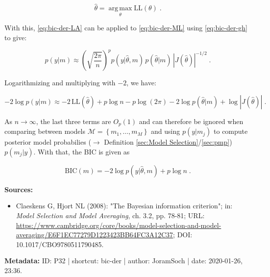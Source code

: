\documentclass[a4paper,12pt,twoside]{book}
\begin{document}
\begin{equation} \label{eq:bic-der-MLE}
\hat{\theta} = \operatorname*{arg\,max}_\theta \mathrm{LL}(\theta) \; .
\end{equation}

With this, \eqref{eq:bic-der-LA} can be applied to \eqref{eq:bic-der-ML} using \eqref{eq:bic-der-gh} to give:

\begin{equation} \label{eq:bic-der-ML-approx}
p(y|m) \approx \left( \sqrt{\frac{2 \pi}{n}} \right)^p p(y|\hat{\theta},m) \, p(\hat{\theta}|m) \, \left| J(\hat{\theta}) \right|^{-1/2} \; .
\end{equation}

Logarithmizing and multiplying with $-2$, we have:

\begin{equation} \label{eq:bic-der-LME-approx}
-2 \log p(y|m) \approx -2 \, \mathrm{LL}(\hat{\theta}) + p \log n - p \log(2 \pi) - 2 \log p(\hat{\theta}|m) + \log \left| J(\hat{\theta}) \right| \; .
\end{equation}

As $n \to \infty$, the last three terms are $O_p(1)$ and can therefore be ignored when comparing between models $\mathcal{M} = \left\lbrace m_1, \ldots, m_M \right\rbrace$ and using $p(y \vert m_j)$ to compute posterior model probabilies ($\rightarrow$ Definition \ref{sec:Model Selection}/\ref{sec:pmp}) $p(m_j \vert y)$. With that, the BIC is given as

\begin{equation} \label{eq:bic-der-BIC-qed}
\mathrm{BIC}(m) = -2 \log p(y|\hat{\theta}, m) + p \log n \; .
\end{equation}


\vspace{1em}
\textbf{Sources:}
\begin{itemize}
\item Claeskens G, Hjort NL (2008): "The Bayesian information criterion"; in: \textit{Model Selection and Model Averaging}, ch. 3.2, pp. 78-81; URL: \url{https://www.cambridge.org/core/books/model-selection-and-model-averaging/E6F1EC77279D1223423BB64FC3A12C37}; DOI: 10.1017/CBO9780511790485.
\end{itemize}


\vspace{1em}
\textbf{Metadata:} ID: P32 | shortcut: bic-der | author: JoramSoch | date: 2020-01-26, 23:36.
\vspace{1em}
\end{document}
